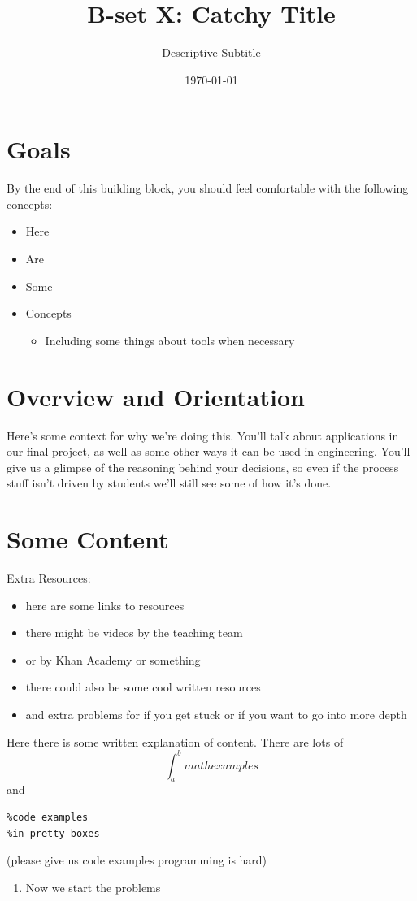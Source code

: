 \documentclass{tufte-handout}
\title{B-set X: Catchy Title}
\author{Descriptive Subtitle}
\date{\today}
\begin{document}
\maketitle

\vspace{0.1in}

\section{Goals}
By the end of this building block, you should feel comfortable with the following concepts:
\begin{itemize}
\item Here
\item Are
\item Some
\item Concepts
\begin{itemize}
\item Including some things about tools when necessary
\end{itemize}
\end{itemize}

\section{Overview and Orientation}
Here's some context for why we're doing this. You'll talk about applications in our final project, as well as some other ways it can be used in engineering. You'll give us a glimpse of the reasoning behind your decisions, so even if the process stuff isn't driven by students we'll still see some of how it's done.

\section{Some Content}
\begin{marginfigure}
Extra Resources:
\begin{itemize}
\item here are some links to resources
\item there might be videos by the teaching team
\item or by Khan Academy or something
\item there could also be some cool written resources
\item and extra problems for if you get stuck or if you want to go into more depth
\end{itemize}

\end{marginfigure}
Here there is some written explanation of content. There are lots of
$$\int_{a}^{b} math examples$$
and
\begin{lstlisting}
%code examples
%in pretty boxes
\end{lstlisting}
(please give us code examples programming is hard)
\begin{enumerate}
\item Now we start the problems
\end{enumerate}
\end{document}
